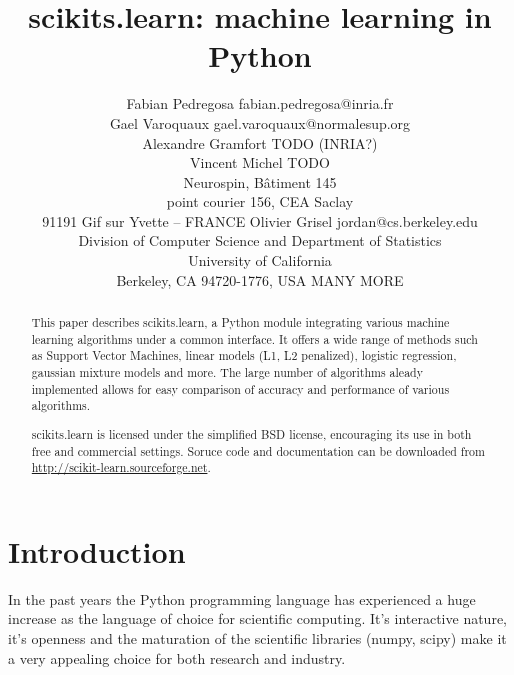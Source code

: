 \documentclass[twoside,11pt]{article}
\begin{document}
\title{scikits.learn: machine learning in Python}


\author{\name Fabian Pedregosa \email fabian.pedregosa@inria.fr \\
        \name Gael Varoquaux \email gael.varoquaux@normalesup.org  \\
        \name Alexandre Gramfort \email TODO (INRIA?)\\
        \name Vincent Michel  \email TODO \\
       \addr  Neurospin, Bâtiment 145\\
       point courier 156, CEA Saclay\\
       91191 Gif sur Yvette – FRANCE
       \AND
       \name Olivier Grisel \email jordan@cs.berkeley.edu \\
       \addr Division of Computer Science and Department of Statistics\\
       University of California\\
       Berkeley, CA 94720-1776, USA
       \AND
       \name MANY MORE
}





\maketitle

\begin{abstract}
This paper describes scikits.learn, a Python module integrating
various machine learning algorithms under a common interface. It
offers a wide range of methods such as Support Vector Machines, linear
models (L1, L2 penalized), logistic regression, gaussian mixture models and
more. The large number of algorithms aleady implemented allows for
easy comparison of accuracy and performance of various algorithms.

scikits.learn is licensed under the simplified BSD license,
encouraging its use in both free and commercial settings. Soruce code
and documentation can be downloaded from
\url{http://scikit-learn.sourceforge.net}.

\end{abstract}




\section{Introduction}
In the past years the Python programming language has experienced a
huge increase as the language of choice for scientific computing. It's
interactive nature, it's openness and the maturation of the scientific
libraries (numpy, scipy) make it a very appealing choice for both
research and industry.
\end{document}
